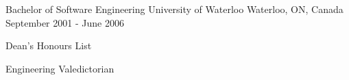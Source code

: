 

\begin{cventries}

  \cventry
    {Bachelor of Software Engineering} %
    {University of Waterloo} %
    {Waterloo, ON, Canada} %
    {September 2001 - June 2006} %
    {
      \begin{cvitems} %
        \item {Dean's Honours List}
        \item {Engineering Valedictorian}
      \end{cvitems}
    }

\end{cventries}
